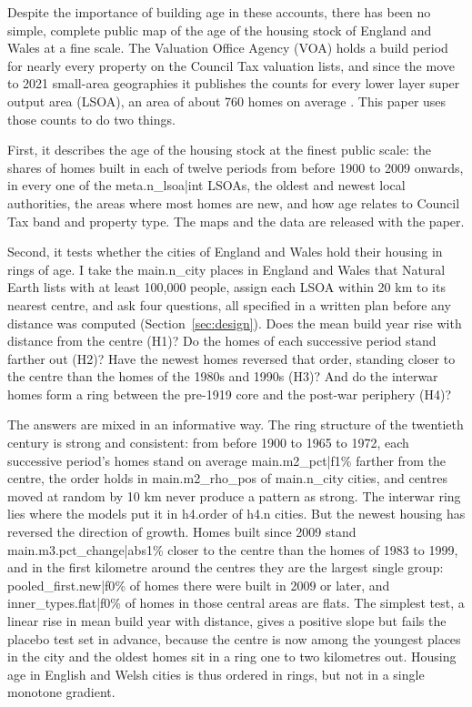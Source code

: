 Despite the importance of building age in these accounts, there has been no simple, complete public map of the age of the housing stock of England and Wales at a fine scale. The Valuation Office Agency (VOA) holds a build period for nearly every property on the Council Tax valuation lists, and since the move to 2021 small-area geographies it publishes the counts for every lower layer super output area (LSOA), an area of about 760 homes on average \citep{voa2025,voa2025bg}. This paper uses those counts to do two things.

First, it describes the age of the housing stock at the finest public scale: the shares of homes built in each of twelve periods from before 1900 to 2009 onwards, in every one of the {{meta.n_lsoa|int}} LSOAs, the oldest and newest local authorities, the areas where most homes are new, and how age relates to Council Tax band and property type. The maps and the data are released with the paper.

Second, it tests whether the cities of England and Wales hold their housing in rings of age. I take the {{main.n_city}} places in England and Wales that Natural Earth lists with at least 100,000 people, assign each LSOA within 20 km to its nearest centre, and ask four questions, all specified in a written plan before any distance was computed (Section~\ref{sec:design}). Does the mean build year rise with distance from the centre (H1)? Do the homes of each successive period stand farther out (H2)? Have the newest homes reversed that order, standing closer to the centre than the homes of the 1980s and 1990s (H3)? And do the interwar homes form a ring between the pre-1919 core and the post-war periphery (H4)?

The answers are mixed in an informative way. The ring structure of the twentieth century is strong and consistent: from before 1900 to 1965 to 1972, each successive period's homes stand on average {{main.m2_pct|f1}}\% farther from the centre, the order holds in {{main.m2_rho_pos}} of {{main.n_city}} cities, and centres moved at random by 10 km never produce a pattern as strong. The interwar ring lies where the models put it in {{h4.order}} of {{h4.n}} cities. But the newest housing has reversed the direction of growth. Homes built since 2009 stand {{main.m3.pct_change|abs1}}\% closer to the centre than the homes of 1983 to 1999, and in the first kilometre around the centres they are the largest single group: {{pooled_first.new|f0}}\% of homes there were built in 2009 or later, and {{inner_types.flat|f0}}\% of homes in those central areas are flats. The simplest test, a linear rise in mean build year with distance, gives a positive slope but fails the placebo test set in advance, because the centre is now among the youngest places in the city and the oldest homes sit in a ring one to two kilometres out. Housing age in English and Welsh cities is thus ordered in rings, but not in a single monotone gradient.

